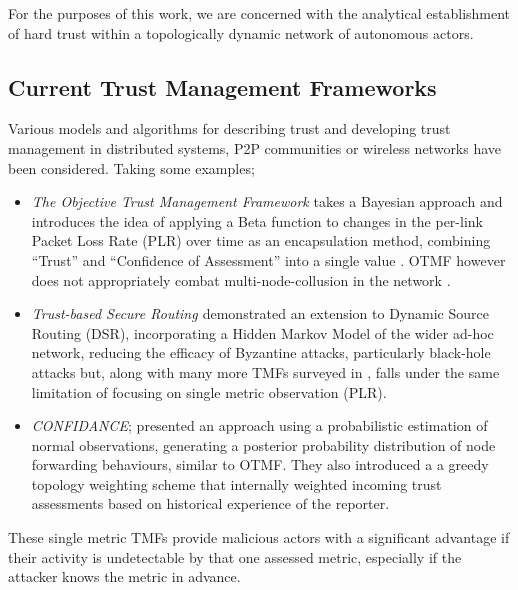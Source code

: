 \documentclass[runningheads,a4paper]{llncs}
\begin{document}
For the purposes of this work, we are concerned with the analytical establishment of hard trust within a topologically dynamic network of autonomous actors.

\subsection{Current Trust Management Frameworks}

Various models and algorithms for describing trust and developing trust management in distributed systems, P2P communities or wireless networks have been considered.
Taking some examples;

\begin{itemize}
  \item \emph{The Objective Trust Management Framework} takes a Bayesian approach and introduces the idea of applying a Beta function to changes in the per-link Packet Loss Rate (PLR) over time as an encapsulation method, combining ``Trust'' and ``Confidence of Assessment'' into a single value \cite{Li2008}.
    OTMF however does not appropriately combat multi-node-collusion in the network \cite{Cho2011}.

  \item \emph{Trust-based Secure Routing \cite{Moe2008a}} demonstrated an extension to Dynamic Source Routing (DSR), incorporating a Hidden Markov Model of the wider ad-hoc network, reducing the efficacy of Byzantine attacks, particularly black-hole attacks but, along with many more TMFs surveyed in \cite{Cho2011}, falls under the same limitation of focusing on single metric observation (PLR).
  \item \emph{CONFIDANCE}; \cite{Buchegger2002} presented an approach using a probabilistic estimation of normal observations, generating a posterior probability distribution of node forwarding behaviours, similar to OTMF. They also introduced a a greedy topology weighting scheme that internally weighted incoming trust assessments based on historical experience of the reporter.
\end{itemize}

These single metric TMFs provide malicious actors with a significant advantage if their activity is undetectable by that one assessed metric, especially if the attacker knows the metric in advance.
\end{document}
